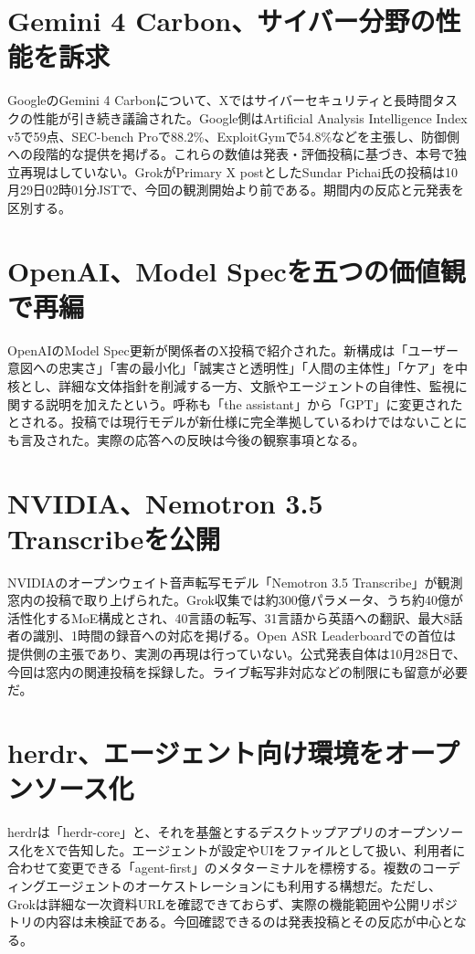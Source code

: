 \section{Gemini 4 Carbon、サイバー分野の性能を訴求}
GoogleのGemini 4 Carbonについて、Xではサイバーセキュリティと長時間タスクの性能が引き続き議論された。Google側はArtificial Analysis Intelligence Index v5で59点、SEC-bench Proで88.2\%、ExploitGymで54.8\%などを主張し、防御側への段階的な提供を掲げる。これらの数値は発表・評価投稿に基づき、本号で独立再現はしていない。GrokがPrimary X postとしたSundar Pichai氏の投稿は10月29日02時01分JSTで、今回の観測開始より前である。期間内の反応と元発表を区別する。

\section{OpenAI、Model Specを五つの価値観で再編}
OpenAIのModel Spec更新が関係者のX投稿で紹介された。新構成は「ユーザー意図への忠実さ」「害の最小化」「誠実さと透明性」「人間の主体性」「ケア」を中核とし、詳細な文体指針を削減する一方、文脈やエージェントの自律性、監視に関する説明を加えたという。呼称も「the assistant」から「GPT」に変更されたとされる。投稿では現行モデルが新仕様に完全準拠しているわけではないことにも言及された。実際の応答への反映は今後の観察事項となる。

\section{NVIDIA、Nemotron 3.5 Transcribeを公開}
NVIDIAのオープンウェイト音声転写モデル「Nemotron 3.5 Transcribe」が観測窓内の投稿で取り上げられた。Grok収集では約300億パラメータ、うち約40億が活性化するMoE構成とされ、40言語の転写、31言語から英語への翻訳、最大8話者の識別、1時間の録音への対応を掲げる。Open ASR Leaderboardでの首位は提供側の主張であり、実測の再現は行っていない。公式発表自体は10月28日で、今回は窓内の関連投稿を採録した。ライブ転写非対応などの制限にも留意が必要だ。

\section{herdr、エージェント向け環境をオープンソース化}
herdrは「herdr-core」と、それを基盤とするデスクトップアプリのオープンソース化をXで告知した。エージェントが設定やUIをファイルとして扱い、利用者に合わせて変更できる「agent-first」のメタターミナルを標榜する。複数のコーディングエージェントのオーケストレーションにも利用する構想だ。ただし、Grokは詳細な一次資料URLを確認できておらず、実際の機能範囲や公開リポジトリの内容は未検証である。今回確認できるのは発表投稿とその反応が中心となる。

